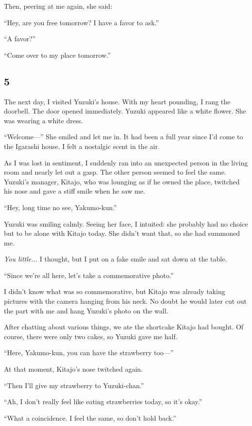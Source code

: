 \documentclass[
    a4paper,
    12pt,
    twoside,
    openany,
    UTF8,
    fontset=windows
]{ctexbook}
\begin{document}
Then, peering at me again, she said:

``Hey, are you free tomorrow? I have a favor to ask.''

``A favor?''

``Come over to my place tomorrow.''


\subsection*{5}

The next day, I visited Yuzuki's house. With my heart pounding, I rang the doorbell. The door opened immediately. Yuzuki appeared like a white flower. She was wearing a white dress.

``Welcome---'' She smiled and let me in. It had been a full year since I'd come to the Igarashi house. I felt a nostalgic scent in the air.

As I was lost in sentiment, I suddenly ran into an unexpected person in the living room and nearly let out a gasp. The other person seemed to feel the same. Yuzuki's manager, Kitajo, who was lounging as if he owned the place, twitched his nose and gave a stiff smile when he saw me.

``Hey, long time no see, Yakumo-kun.''

Yuzuki was smiling calmly. Seeing her face, I intuited: she probably had no choice but to be alone with Kitajo today. She didn't want that, so she had summoned me.

\emph{You little...} I thought, but I put on a fake smile and sat down at the table.

``Since we're all here, let's take a commemorative photo.''

I didn't know what was so commemorative, but Kitajo was already taking pictures with the camera hanging from his neck. No doubt he would later cut out the part with me and hang Yuzuki's photo on the wall.

After chatting about various things, we ate the shortcake Kitajo had bought. Of course, there were only two cakes, so Yuzuki gave me half.

``Here, Yakumo-kun, you can have the strawberry too---''

At that moment, Kitajo's nose twitched again.

``Then I'll give my strawberry to Yuzuki-chan.''

``Ah, I don't really feel like eating strawberries today, so it's okay.''

``What a coincidence. I feel the same, so don't hold back.''
\end{document}
